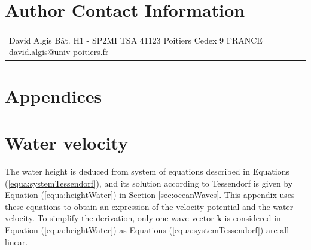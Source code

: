 \documentclass[11pt]{article}
\begin{document}



\small




\section*{Author Contact Information}

\hspace{-2mm}
\begin{tabular}{p{}p{}}
	David Algis\newline
	Bât. H1 - SP2MI\newline
	TSA 41123\newline
	86073 Poitiers Cedex 9\newline
	FRANCE\newline
	\href{mailto:david.algis@univ-poitiers.fr}{david.algis@univ-poitiers.fr}
\end{tabular}

\appendix

\section*{Appendices}
\section{Water velocity}
\label{sec:annexe}
The water height is deduced from system of equations described in Equations (\ref{equa:systemTessendorf}), and its solution according to Tessendorf is given by Equation (\ref{equa:heightWater}) in Section \ref{sec:oceanWaves}.
This appendix uses these equations to obtain an expression of the velocity potential and the water velocity.
To simplify the derivation, only one wave vector $\mathbf{k}$ is considered in Equation (\ref{equa:heightWater}) as Equations (\ref{equa:systemTessendorf}) are all linear.
\end{document}
